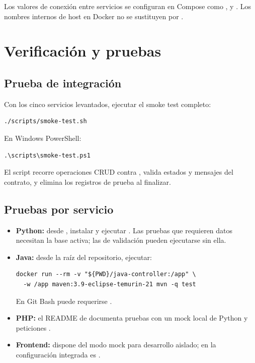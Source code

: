 Los valores de conexión entre servicios se configuran en Compose como ,  y . Los nombres internos de host en Docker no se sustituyen por .

\section{Verificación y pruebas}

\subsection{Prueba de integración}

Con los cinco servicios levantados, ejecutar el smoke test completo:

\begin{lstlisting}
./scripts/smoke-test.sh
\end{lstlisting}

En Windows PowerShell:

\begin{lstlisting}
.\scripts\smoke-test.ps1
\end{lstlisting}

El script recorre operaciones CRUD contra , valida estados y mensajes del contrato, y elimina los registros de prueba al finalizar.

\subsection{Pruebas por servicio}

\begin{itemize}
  \item \textbf{Python:} desde , instalar  y ejecutar . Las pruebas que requieren datos necesitan la base activa; las de validación pueden ejecutarse sin ella.
  \item \textbf{Java:} desde la raíz del repositorio, ejecutar:
\begin{lstlisting}
docker run --rm -v "${PWD}/java-controller:/app" \
  -w /app maven:3.9-eclipse-temurin-21 mvn -q test
\end{lstlisting}
  En Git Bash puede requerirse .
  \item \textbf{PHP:} el README de  documenta pruebas con un mock local de Python y peticiones .
  \item \textbf{Frontend:} \archivo{frontend/api.js} dispone del modo mock para desarrollo aislado; en la configuración integrada  es .
\end{itemize}

